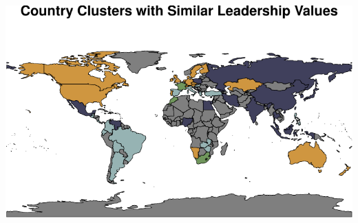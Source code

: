 \documentclass[
]{article}
\begin{document}
\begin{center}\includegraphics[width=0.85\linewidth]{report_files/figure-latex/kmeans-1} \end{center}
\begin{table}[h]


\end{table}
\end{document}
